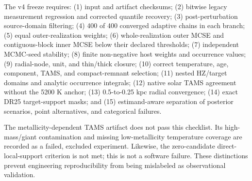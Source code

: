 The v4 freeze requires: (1) input and artifact checksums; (2) bitwise legacy
measurement regression and corrected quantile recovery; (3) post-perturbation
source-domain filtering; (4) 400 of 400 converged adaptive chains in each
branch; (5) equal outer-realization weights; (6) whole-realization outer MCSE
and contiguous-block inner MCSE below their declared thresholds; (7)
independent MCMC-seed stability; (8) finite non-negative host weights and
occurrence values; (9) radial-node, unit, and thin/thick closure; (10) correct
temperature, age, component, TAMS, and compact-remnant selection; (11) nested
HZ/target domains and analytic occurrence integrals; (12) native solar TAMS
agreement without the 5200 K anchor; (13) 0.5-to-0.25 kpc radial convergence;
(14) exact DR25 target-support masks; and (15) estimand-aware separation of
posterior scenarios, point alternatives, and categorical failures.

The metallicity-dependent TAMS artifact does not pass this checklist. Its
high-mass/giant contamination and missing low-metallicity temperature coverage
are recorded as a failed, excluded experiment. Likewise, the zero-candidate
direct-local-support criterion is not met; this is not a software failure.
These distinctions prevent engineering reproducibility from being mislabeled
as observational validation.




